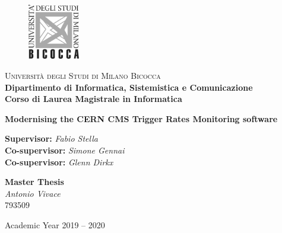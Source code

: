 
\thispagestyle{empty}

\begin{figure}
	\vspace*{-8mm}
	\centering
	\includegraphics[width=0.20\textwidth]{logo-bicocca.jpg}
\end{figure}
\large \noindent \textsc{Università degli Studi di Milano Bicocca} \\
\textbf{Dipartimento di Informatica, Sistemistica e Comunicazione \\
	Corso di Laurea Magistrale in Informatica}

\vfill


\begin{center}
	{\Huge \textbf{Modernising the CERN CMS Trigger Rates Monitoring software}}
\end{center}

\vfill

\begin{flushleft}
	{\Large \textbf{Supervisor:} \textit{Fabio Stella} \\
		\textbf{Co-supervisor:} \textit{Simone Gennai} \\
		\textbf{Co-supervisor:} \textit{Glenn Dirkx}}
\end{flushleft}

\vspace{8mm}
\par

\begin{flushright}
	{\Large \textbf{Master Thesis} \\
		\textit{Antonio Vivace} \\ 793509}
\end{flushright}

\vfill
\par

\begin{center}
	{\large Academic Year 2019 -- 2020}



\end{center}

\clearpage